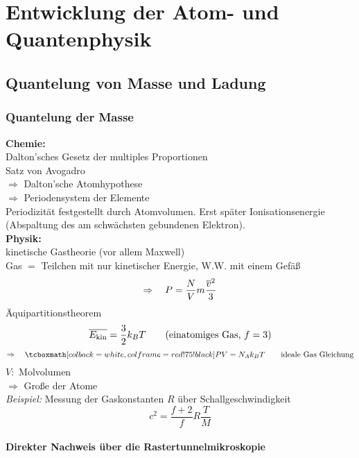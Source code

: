 \chapter{Entwicklung der Atom- und Quantenphysik}

\section{Quantelung von Masse und Ladung}

\subsection{Quantelung der Masse}

\textbf{Chemie:}\\
Dalton'sches Gesetz der multiples Proportionen\\
Satz von Avogadro\\[5pt]
$ \Rightarrow $ Dalton'sche Atomhypothese\\
$ \Rightarrow $ Periodensystem der Elemente\\[5pt]
Periodizität festgestellt durch Atomvolumen. Erst später Ionisationsenergie (Abspaltung des am schwächsten gebundenen Elektron).\\[5pt]
\textbf{Physik:}\\
kinetische Gastheorie (vor allem Maxwell)\\
Gas $ = $ Teilchen mit nur kinetischer Energie, W.W. mit einem Gefäß
\begin{equation*}
\Rightarrow \quad P = \frac{N}{V} m \frac{\overline{v}^2}{3}
\end{equation*}
Äquipartitionstheorem
\begin{equation*}
\overline{E_{\textrm{kin}}} = \frac{3}{2} k_B T \qquad (\textrm{einatomiges Gas, } f = 3)
\end{equation*}
\begin{equation*}
\Rightarrow \quad \rmbox{P V = N_A k_B T} \qquad \tx{ideale Gas Gleichung}
\end{equation*}
$ V : $ Molvolumen\\
$ \Rightarrow $ Große der Atome\\[5pt]
\emph{Beispiel:} Messung der Gaskonstanten $ R $ über Schallgeschwindigkeit\\
\begin{equation*}
c^2 = \frac{f + 2}{f} R \frac{T}{M} 
\end{equation*}

\subsubsection{Direkter Nachweis über die Rastertunnelmikroskopie}

